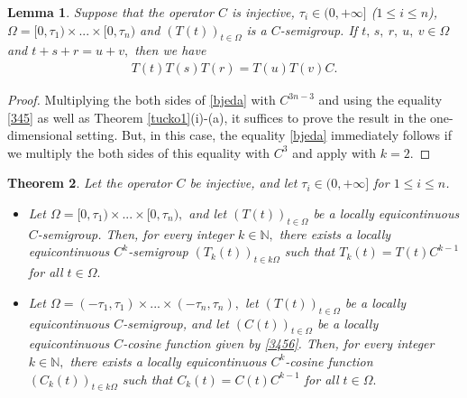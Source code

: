 \documentclass{amsart}
\newtheorem{thm}{Theorem}[section]
\newtheorem{lem}[thm]{Lemma}
\theoremstyle{definition}
\theoremstyle{remark}
\numberwithin{equation}{section}
\begin{document}
\begin{lem}\label{mata}
Suppose that the operator $C$ is injective, $\tau_{i}\in (0,+\infty]$ ($1\leq i \leq n$), $\Omega =[0,\tau_{1}) \times ... \times [0,\tau_{n})$ and $(T(t))_{t\in \Omega}$ 
is a $C$-semigroup. If $t,\,s,\ r,\ u,\ v \in \Omega$ and $t+s+r=u+v,$ then we have
\begin{align}\label{bjeda}
T(t)T(s)T(r)=T(u)T(v)C.
\end{align}
\end{lem}

\begin{proof}
Multiplying the both sides of \eqref{bjeda} with $C^{3n-3}$ and using the equality \eqref{345} as well as Theorem \ref{tucko1}(i)-(a), it suffices to prove the result in the one-dimensional setting. But, in this case, the equality \eqref{bjeda} immediately follows if we multiply the both sides of this equality with $C^{3}$ and apply \cite[Theorem 2.6]{wang} with $k=2.$
\end{proof}

\begin{thm}\label{nap}
Let the operator $C$ be injective, and let $\tau_{i}\in (0,+\infty]$ for $1\leq i \leq n$. 
\begin{itemize}
\item[(i)] Let $\Omega =[0,\tau_{1}) \times ... \times [0,\tau_{n}),$ and let $(T(t))_{t\in \Omega}$ 
be a locally equicontinuous $C$-semigroup. Then, for every integer $k\in {\mathbb N},$ there exists a locally equicontinuous $C^{k}$-semigroup $(T_{k}(t))_{t\in k\Omega}$ such that $T_{k}(t)=T(t)C^{k-1}$ for all $t\in \Omega.$ 
\item[(ii)] Let $\Omega =(-\tau_{1},\tau_{1}) \times ... \times (-\tau_{n},\tau_{n}),$ let $(T(t))_{t\in \Omega}$ 
be a locally equicontinuous $C$-semigroup, and let $(C(t))_{t\in \Omega}$ 
be a locally equicontinuous $C$-cosine function given by \eqref{3456}. Then, for every integer $k\in {\mathbb N},$ there exists a locally equicontinuous $C^{k}$-cosine function $(C_{k}(t))_{t\in k\Omega}$ such that $C_{k}(t)=C(t)C^{k-1}$ for all $t\in \Omega.$ 
\end{itemize}
\end{thm}
\end{document}
